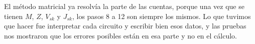 \documentclass[12pt, letterpaper]{article}
\begin{document}
El método matricial ya resolvía la parte de las cuentas, porque una vez que se tienen $M$, $Z$, $V_{sk}$ y $J_{sk}$,
los pasos 8 a 12 son siempre los mismos. Lo que tuvimos que hacer fue interpretar cada circuito y escribir bien esos datos, y las
pruebas nos mostraron que los errores posibles están en esa parte y no en el cálculo.
\end{document}
